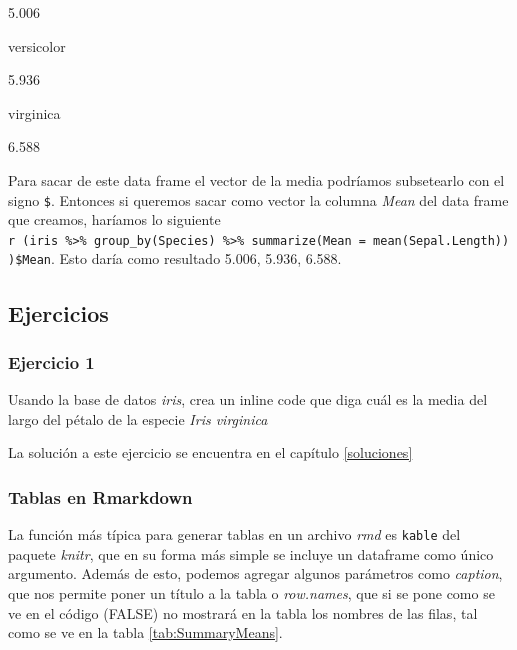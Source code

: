 \documentclass[]{book}
\newenvironment{Shaded}{\begin{snugshade}}{\end{snugshade}}
\newcommand{\DataTypeTok}[1]{\textcolor[rgb]{0.13,0.29,0.53}{#1}}
\newcommand{\KeywordTok}[1]{\textcolor[rgb]{0.13,0.29,0.53}{\textbf{#1}}}
\newcommand{\NormalTok}[1]{#1}
\newcommand{\OperatorTok}[1]{\textcolor[rgb]{0.81,0.36,0.00}{\textbf{#1}}}
\newcommand{\OtherTok}[1]{\textcolor[rgb]{0.56,0.35,0.01}{#1}}
\newcommand{\StringTok}[1]{\textcolor[rgb]{0.31,0.60,0.02}{#1}}
\begin{document}
5.006

versicolor

5.936

virginica

6.588

Para sacar de este data frame el vector de la media podríamos
subsetearlo con el signo \texttt{\$}. Entonces si queremos sacar como
vector la columna \emph{Mean} del data frame que creamos, haríamos lo
siguiente
\texttt{\textasciigrave{}r\ (iris\ \%\textgreater{}\%\ group\_by(Species)\ \%\textgreater{}\%\ summarize(Mean\ =\ mean(Sepal.Length)))\$Mean\textasciigrave{}}.
Esto daría como resultado 5.006, 5.936, 6.588.

\hypertarget{ejercicios-1}{%
\subsection{Ejercicios}\label{ejercicios-1}}

\hypertarget{ejercicio-1-1}{%
\subsubsection{Ejercicio 1}\label{ejercicio-1-1}}

Usando la base de datos \emph{iris}, crea un inline code que diga cuál
es la media del largo del pétalo de la especie \emph{Iris virginica}

La solución a este ejercicio se encuentra en el capítulo
\ref{soluciones}

\hypertarget{tablas-en-rmarkdown}{%
\subsubsection{Tablas en Rmarkdown}\label{tablas-en-rmarkdown}}

La función más típica para generar tablas en un archivo \emph{rmd} es
\texttt{kable} del paquete \emph{knitr}, que en su forma más simple se
incluye un dataframe como único argumento. Además de esto, podemos
agregar algunos parámetros como \emph{caption}, que nos permite poner un
título a la tabla o \emph{row.names}, que si se pone como se ve en el
código (FALSE) no mostrará en la tabla los nombres de las filas, tal
como se ve en la tabla \ref{tab:SummaryMeans}.

\begin{Shaded}
\end{Shaded}
\end{document}
